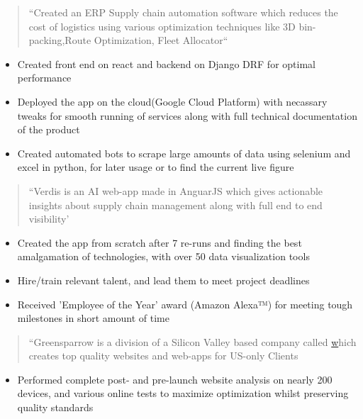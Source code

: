 \documentclass[10pt,a4paper]{altacv}
\begin{document}
\begin{quote}
  ``Created an ERP Supply chain automation software which reduces the cost of logistics using various optimization techniques like 3D bin-packing,Route Optimization, Fleet Allocator``
\end{quote}
\begin{itemize}
\item Created front end on react and backend on Django DRF for optimal performance
\item Deployed the app on the cloud(Google Cloud Platform) with necassary tweaks for smooth running of services along with full technical documentation of the product
\item Created automated bots to scrape large amounts of data using selenium and excel in python, for later usage or to find the current live figure
\end{itemize}

\divider



\begin{quote}
  ``Verdis is an AI web-app made in AnguarJS which gives actionable insights about supply chain management along with full end to end visibility'
\end{quote}
\begin{itemize}

\item Created the app from scratch after 7 re-runs and finding the best amalgamation of technologies, with over 50 data visualization tools
\item Hire/train relevant talent, and lead them to meet project deadlines
\item Received 'Employee of the Year' award (Amazon Alexa™) for meeting tough milestones in short amount of time
\end{itemize}

\divider


\begin{quote}
  ``Greensparrow is a division of a Silicon Valley based company called \href {www.Webenertia.com} which creates top quality websites and web-apps for US-only Clients
\end{quote}
\begin{itemize}
\item Performed complete post- and pre-launch website analysis on nearly 200 devices, and various online tests to maximize optimization whilst preserving quality standards
\end{itemize}
\end{document}
